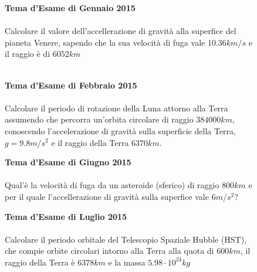 \begin{figure}[h!]
\textbf{Tema d'Esame di Gennaio 2015}\\ \\
Calcolare il valore dell'accellerazione di gravità alla superfice del pianeta Venere, sapendo che la sua velocità di fuga vale $10.36km/s$ e il raggio è di $6052km$\\ \\
    \noindent{}	
\end{figure}

\begin{figure}[h!]
\textbf{Tema d'Esame di Febbraio 2015}\\ \\
Calcolare il periodo di rotazione della Luna attorno alla Terra assumendo che percorra un'orbita circolare di raggio $384000 km$, conoscendo l'accelerazione di gravità sulla superficie della Terra, $g = 9.8 m/s^2$
 e il raggio della Terra $6370 km$. 
\end{figure}

\begin{figure}[h!]
\textbf{Tema d'Esame di Giugno 2015}\\ \\
Qual'è la velocità di fuga da un asteroide (sferico) di raggio $800km$ e per il quale l'accellerazione di gravità sulla superfice vale $6m/s^2$?
\end{figure}

\begin{figure}[h!]
\textbf{Tema d'Esame di Luglio 2015}\\ \\
Calcolare il periodo orbitale del Telescopio Spaziale Hubble (HST), che compie orbite circolari intorno alla Terra alla quota di $600km$, il raggio della Terra è $6378km$ e la massa $5.98\cdot 10^{24}kg$
\end{figure}
